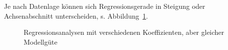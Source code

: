 \documentclass[
  letterpaper,
]{scrbook}
\theoremstyle{definition}
\theoremstyle{definition}
\theoremstyle{definition}
\theoremstyle{remark}
\begin{document}
Je nach Datenlage können sich Regressionsgerade in Steigung oder
Achsenabschnitt unterscheiden, s. Abbildung~\ref{fig-regr-div}.

\begin{figure}

\begin{minipage}{0.50\linewidth}



\end{minipage}%
%
\begin{minipage}{0.50\linewidth}



\end{minipage}%

\caption{\label{fig-regr-div}Regressionsanalysen mit verschiedenen
Koeffizienten, aber gleicher Modellgüte}

\end{figure}%
\end{document}
